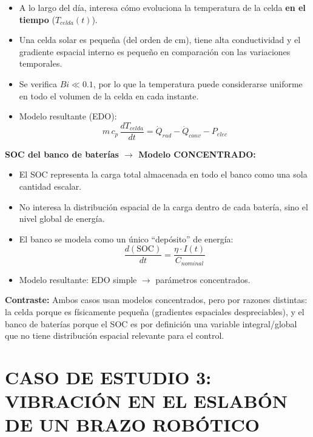 \documentclass[12pt,a4paper]{article}
\begin{document}
\begin{itemize}
    \item A lo largo del día, interesa cómo evoluciona la temperatura de la celda \textbf{en el
          tiempo} ($T_{celda}(t)$).
    \item Una celda solar es pequeña (del orden de cm), tiene alta conductividad y el gradiente
          espacial interno es pequeño en comparación con las variaciones temporales.
    \item Se verifica $Bi \ll 0.1$, por lo que la temperatura puede considerarse uniforme en todo
          el volumen de la celda en cada instante.
    \item Modelo resultante (EDO):
          \begin{equation}
              m\,c_p\,\frac{dT_{celda}}{dt} = \dot{Q}_{rad} - \dot{Q}_{conv} - P_{elec}
          \end{equation}
\end{itemize}

\noindent\textbf{SOC del banco de baterías $\rightarrow$ Modelo CONCENTRADO:}

\begin{itemize}
    \item El SOC representa la carga total almacenada en todo el banco como una sola cantidad
          escalar.
    \item No interesa la distribución espacial de la carga dentro de cada batería, sino el nivel
          global de energía.
    \item El banco se modela como un único ``depósito'' de energía:
          \begin{equation}
              \frac{d(\text{SOC})}{dt} = \frac{\eta \cdot I(t)}{C_{nominal}}
          \end{equation}
    \item Modelo resultante: EDO simple $\rightarrow$ parámetros concentrados.
\end{itemize}

\noindent\textbf{Contraste:} Ambos casos usan modelos concentrados, pero por razones distintas:
la celda porque es físicamente pequeña (gradientes espaciales despreciables), y el banco de
baterías porque el SOC es por definición una variable integral/global que no tiene distribución
espacial relevante para el control.

\newpage

\section*{CASO DE ESTUDIO 3: VIBRACIÓN EN EL ESLABÓN DE UN BRAZO ROBÓTICO}
\end{document}
